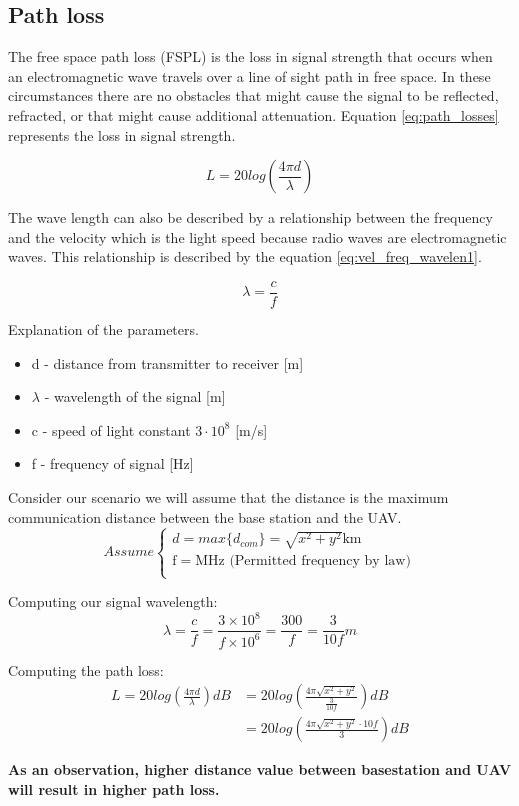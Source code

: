 
\subsection*{Path loss}\label{subsection:path_loss}

The free space path loss (FSPL) is the loss in signal strength that occurs when an electromagnetic wave travels over a line of sight path in free space. In these circumstances there are no obstacles that might cause the signal to be reflected, refracted, or that might cause additional attenuation. Equation \ref{eq:path_losses} represents the loss in signal strength.

\begin{equation}\label{eq:path_losses}
L = 20log\left (\frac{4\pi d}{\lambda} \right)
\end{equation}

The wave length can also be described by a relationship between the frequency and the velocity which is the light speed because radio waves are electromagnetic waves. This relationship is described by the equation \ref{eq:vel_freq_wavelen1}.

\begin{equation}\label{eq:vel_freq_wavelen1}
\lambda = \frac{c}{f}
\end{equation}


Explanation of the parameters.
\begin{itemize}
\item d - distance from transmitter to receiver [m]
\item $\lambda$ - wavelength of the signal [m]
\item c - speed of light constant $3\cdot 10^8$ [m/s] 
\item f - frequency of signal [Hz]
\end{itemize}

Consider our scenario we will assume that the distance is the maximum communication distance between the base station and the UAV. 
\begin{equation*}
Assume \begin{cases}
d = max\{ d_{com} \} = \sqrt{x^2+y^2} \text{km}\\
\text{f} = \text{MHz (Permitted frequency by law})\\
\end{cases}
\end{equation*}

Computing our signal wavelength:
\begin{equation}\label{eq:vel_freq_wavelen2}
\lambda = \frac{c}{f} = \frac{3\times 10^{8}}{f\times 10^{6}}=\frac{300}{f}=\frac{3}{10f}m
\end{equation}

Computing the path loss:
\begin{align*}\label{eq:path_loses_calc}
L = 20log\left (\frac{4\pi d}{\lambda} \right) dB &= 20log\left (\frac{4\pi \sqrt{x^2+y^2}}{\frac{3}{10f}} \right) dB \\ 
&= 20log\left (\frac{4\pi \sqrt{x^2+y^2}\cdot 10f}{ 3} \right) dB
\end{align*}

\noindent \textbf{As an observation, higher distance value between basestation and UAV will result in higher path loss.}